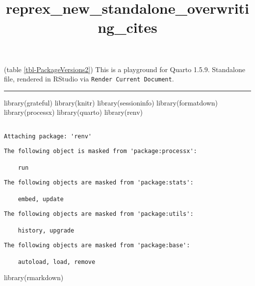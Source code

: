 \documentclass[
  letterpaper,
  DIV=11,
  numbers=noendperiod]{scrartcl}
\title{reprex\_new\_standalone\_overwriting\_cites}
\author{}
\date{}
\newenvironment{Shaded}{\begin{snugshade}}{\end{snugshade}}
\newcommand{\FunctionTok}[1]{\textcolor[rgb]{0.28,0.35,0.67}{#1}}
\newcommand{\NormalTok}[1]{\textcolor[rgb]{0.00,0.23,0.31}{#1}}
\begin{document}
\maketitle

(table \ref{tbl-PackageVersions2}) This is a playground for Quarto
1.5.9. Standalone file, rendered in RStudio via
\texttt{Render\ Current\ Document}.

\begin{center}\rule{0.5\linewidth}{0.5pt}\end{center}

\begin{Shaded}
\begin{Highlighting}[]
\FunctionTok{library}\NormalTok{(grateful)}
\FunctionTok{library}\NormalTok{(knitr)}
\FunctionTok{library}\NormalTok{(sessioninfo)}
\FunctionTok{library}\NormalTok{(formatdown)}
\FunctionTok{library}\NormalTok{(processx)}
\FunctionTok{library}\NormalTok{(quarto)}
\FunctionTok{library}\NormalTok{(renv)}
\end{Highlighting}
\end{Shaded}

\begin{verbatim}

Attaching package: 'renv'
\end{verbatim}

\begin{verbatim}
The following object is masked from 'package:processx':

    run
\end{verbatim}

\begin{verbatim}
The following objects are masked from 'package:stats':

    embed, update
\end{verbatim}

\begin{verbatim}
The following objects are masked from 'package:utils':

    history, upgrade
\end{verbatim}

\begin{verbatim}
The following objects are masked from 'package:base':

    autoload, load, remove
\end{verbatim}

\begin{Shaded}
\begin{Highlighting}[]
\FunctionTok{library}\NormalTok{(rmarkdown)}
\end{Highlighting}
\end{Shaded}
\end{document}
